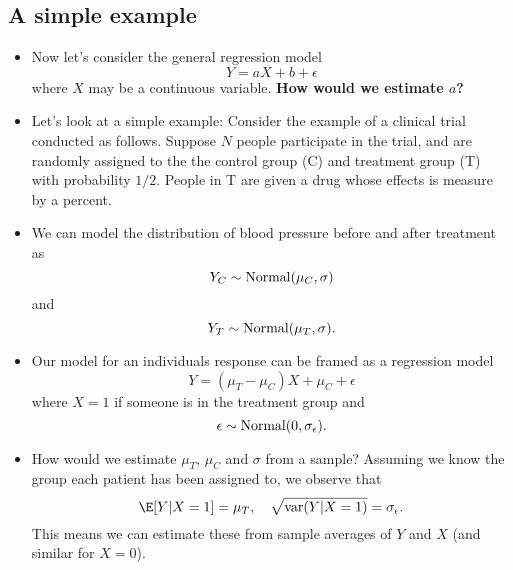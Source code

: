  





\subsection{A simple example}
\begin{itemize}
\item Now let's consider the general regression model
\begin{equation}
Y = aX + b + \epsilon 
\end{equation}
where $X$ may be a continuous variable. 
{\bf How would we estimate $a$? }
\item Let's look at a simple example: 
Consider the example of a clinical trial conducted as follows. Suppose $N$ people participate in the trial, and are randomly assigned to the the control group (C) and treatment group (T) with probability $1/2$. People in T are given a drug whose effects is measure by a percent.  
\item We can model the distribution of blood pressure before and after treatment as 
\begin{equation}
Y_C \sim {\rm Normal}(\mu_C,\sigma)
\end{equation}
and 
\begin{equation}
Y_T \sim {\rm Normal}(\mu_T,\sigma).
\end{equation}
\item Our model for an individuals response can be framed as a regression model 
\begin{equation}\label{eq:clinical}
Y  = (\mu_T-\mu_C)X + \mu_C + \epsilon
\end{equation}
where $X=1$ if someone is in the treatment group and 
\begin{equation}
\epsilon \sim {\rm Normal}(0,\sigma_{\epsilon}). 
\end{equation}
\item How would we estimate $\mu_T$, $\mu_C$ and $\sigma$ from a sample? Assuming we know the group each patient has been assigned to, we observe that 
\begin{equation}
\E[Y|X=1] = \mu_T,\quad  \sqrt{{\rm var}(Y|X=1)} = \sigma_{\epsilon}. 
\end{equation}
This means we can estimate these from sample averages of $Y$ and $X$ (and similar for $X=0$).

\end{itemize}
